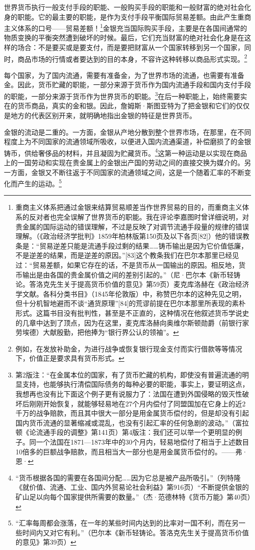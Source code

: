 \documentclass{ctexbook}
\begin{document}
        世界货币执行一般支付手段的职能、一般购买手段的职能和一般财富的绝对社会化身的职能。它的最主要的职能，是作为支付手段平衡国际贸易差额。由此产生重商主义体系的口号——贸易差额！\footnote{重商主义体系把通过金银来结算贸易顺差当作世界贸易的目的，而重商主义体系的反对者也完全误解了世界货币的职能。我在评论李嘉图时曾详细说明，对贵金属的国际运动的错误理解，不过是反映了对调节流通手段量的规律的错误理解。（《政治经济学批判》1859年柏林版第150页及以下各页[82]）他的错误教条是：“贸易逆差只能是流通手段过剩的结果……铸币输出是因为它价值低廉，不是逆差的结果，而是逆差的原因。”[83]这个教条我们在巴尔本那里已经见过：“贸易差额，如果它存在的话，不是货币从一国输出的原因。相反地，货币输出是由各国的贵金属价值之间的差别引起的。”（尼·巴尔本《新币轻铸论。答洛克先生关于提高货币价值的意见》第59页）麦克库洛赫在《政治经济学文献。各科分类书目》（1845年伦敦版）中，称赞巴尔本的这种先见之明，但十分机智地避而不谈“通货原理”[84]的荒谬前提在巴尔本那里所表现的素朴形式。这篇书目没有批判性，甚至是不正直的，这种情况在他叙述货币学说史的几章中达到了顶点，因为在这里，麦克库洛赫向奥维尔斯顿勋爵（前银行家劳埃德）大献殷勤，把他捧为“银行界公认的领袖”。}金银充当国际购买手段，主要是在各国间通常的物质变换的平衡突然遭到破坏的时候。最后，它们充当财富的绝对社会化身是在这样的场合：不是要买或是要支付，而是要把财富从一个国家转移到另一个国家，同时，商品市场的行情或者要达到的目的本身，不容许这种转移以商品形式实现。\footnote{例如，在发放补助金，为进行战争或恢复银行现金支付而实行借款等等情况下，价值正是要求具有货币形式。}

        每个国家，为了国内流通，需要有准备金，为了世界市场的流通，也需要有准备金。因此，货币贮藏的职能，一部分来源于货币作为国内流通手段和国内支付手段的职能，一部分来源于货币作为世界货币的职能。\footnote{第2版注：“在金属本位的国家，有了货币贮藏的机构，即使没有普遍流通的明显支持，也能够执行清偿国际债务的每种必要的职能，事实上，要证明这点，我想再也没有比下面这个例子更有说服力了：法国在遭到外国侵略的毁灭性破坏后刚刚开始恢复，就能够轻易地在27个月内偿付了同盟国加在它身上的近2千万的战争赔款，而且其中很大一部分是用金属货币偿付的，但是却没有引起国内货币流通的显著缩减或混乱，也没有引起汇率的任何急剧的波动。”（富拉顿《论流通手段的调整》第141页）{第4版注：我们还可以举一个更明显的例子。同一个法国在1871—1873年中的30个月内，轻易地偿付了相当于上述数目10倍多的巨额战争赔款，而且相当大一部分也是用金属货币偿付的。——弗·恩·}}在后一种职能上，始终需要实在的货币商品，真实的金和银。因此，詹姆斯·斯图亚特为了把金银和它们的仅仅是地方的代表区别开来，就明确地指出金银的特征是世界货币。

        金银的流动是二重的。一方面，金银从产地分散到整个世界市场，在那里，在不同程度上为不同国家的流通领域所吸收，以便进入国内流通渠道，补偿磨损了的金银铸币，供给奢侈品的材料，并且凝固为贮藏货币。\footnote{“货币根据各国的需要在各国间分配……因为它总是被产品所吸引。”（列特隆《就价值、流通、工业、国内外贸易论社会利益》第916页）“不断提供金银的矿山足以向每个国家提供所需要的数量。”（杰·范德林特《货币万能》第40页）}这第一种运动是以实现在商品上的一国劳动和实现在贵金属上的金银出产国的劳动之间的直接交换为媒介的。另一方面，金银又不断往返于不同国家的流通领域之间，这是一个随着汇率的不断变化而产生的运动。\footnote{“汇率每周都会涨落，在一年的某些时间内达到的比率对一国不利，而在另一些时间内又对它有利。”（巴尔本《新币轻铸论。答洛克先生关于提高货币价值的意见》第39页）}
\end{document}
